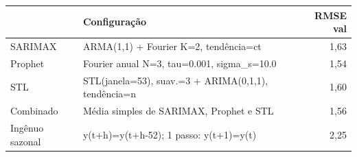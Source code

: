 \begin{tabular}{llr}
\toprule
 & Configuração & RMSE val \\
\midrule
SARIMAX & ARMA(1,1) + Fourier K=2, tendência=ct & 1,63 \\
Prophet & Fourier anual N=3, tau=0.001, sigma\_s=10.0 & 1,54 \\
STL & STL(janela=53), suav.=3 + ARIMA(0,1,1), tendência=n & 1,60 \\
Combinado & Média simples de SARIMAX, Prophet e STL & 1,56 \\
Ingênuo sazonal & y(t+h)=y(t+h-52); 1 passo: y(t+1)=y(t) & 2,25 \\
\bottomrule
\end{tabular}
